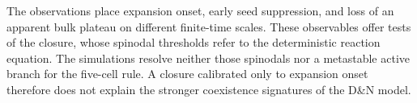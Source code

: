 The observations place expansion onset, early seed suppression, and loss
of an apparent bulk plateau on different finite-time scales. These
observables offer tests of the closure, whose spinodal thresholds refer
to the deterministic reaction equation. The simulations resolve neither
those spinodals nor a metastable active branch for the five-cell rule.
A closure calibrated only to expansion onset therefore does not explain
the stronger coexistence signatures of the D\&N model.
